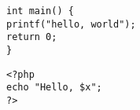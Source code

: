 \documentclass[12pt,ngerman]{scrartcl}
\begin{document}
\begin{verbatim}
int main() {
printf("hello, world");
return 0;
}
\end{verbatim}


\begin{verbatim}
<?php
echo "Hello, $x";
?>
\end{verbatim}
\end{document}
